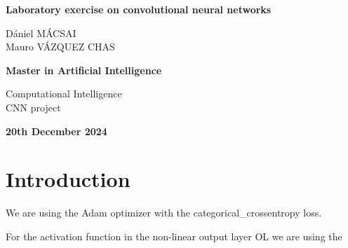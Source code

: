 \documentclass[11pt]{article}
\begin{document}
\begin{titlepage}
    \centering
    \vspace*{2cm}
    
    
    {\Huge\bfseries Laboratory exercise on convolutional neural networks\par}
    \vspace{1cm}
    
    \vspace{2cm}
    
    {\large
    Dániel MÁCSAI \\ 
    Mauro VÁZQUEZ CHAS
    \par}
    
    \vspace{2cm}
    
    {\large
    \textbf{Master in Artificial Intelligence}
    \par}
    

    \vspace{1cm}

    {\large
    Computational Intelligence\\
    CNN project
    \par}
    
    \vspace{1cm}
    
    {\large\bfseries 20th December 2024\par}
    
\end{titlepage}


\newpage

\tableofcontents
\newpage

\section{Introduction}

We are using the Adam optimizer with the categorical_crossentropy loss. 

For the activation function in the non-linear output layer OL we are using the 

\newpage
\printbibliography
\end{document}
